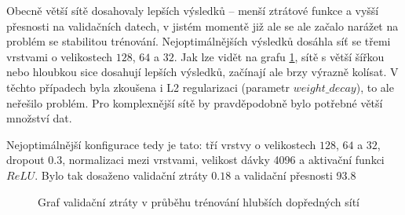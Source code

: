 Obecně větší sítě dosahovaly lepších výsledků – menší ztrátové funkce a vyšší
přesnosti na validačních datech, v jistém momentě již ale se ale začalo narážet
na problém se stabilitou trénování. Nejoptimálnějších výsledků dosáhla síť se
třemi vrstvami o velikostech $128$, $64$ a $32$. Jak lze vidět na grafu
\ref{graph:deepffnn}, sítě s větší šířkou nebo hloubkou sice dosahují lepších
výsledků, začínají ale brzy výrazně kolísat. V těchto případech byla zkoušena i
L2 regularizaci (parametr $weight\_decay$), to ale neřešilo problém. Pro
komplexnější sítě by pravděpodobně bylo potřebné větší množství dat.

Nejoptimálnější konfigurace tedy je tato: tří vrstvy o velikostech $128$, $64$
a $32$, dropout $0.3$, normalizaci mezi vrstvami, velikost dávky 4096 a
aktivační funkci $ReLU$. Bylo tak dosaženo validační ztráty $0.18$ a validační
přesnosti 93.8%

\begin{figure}[]
    \centering
    \caption{Graf validační ztráty v průběhu trénování hlubších dopředných sítí }
    \label{graph:deepffnn}
\end{figure}

